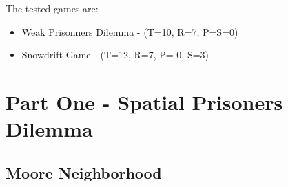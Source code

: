 \documentclass[a4paper, 11pt]{article}
\begin{document}
The tested games are:
\begin{itemize}[noitemsep]
  \item Weak Prisonners Dilemma - (T=10, R=7, P=S=0)
  \item Snowdrift Game - (T=12, R=7, P= 0, S=3)
\end{itemize}

\newpage
\section{Part One - Spatial Prisoners Dilemma}
\subsection{Moore Neighborhood}


\end{document}
